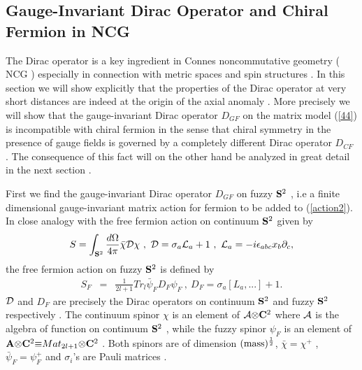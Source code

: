 \documentclass[a4paper,10pt]{article}
\begin{document}
\subsection{Gauge-Invariant Dirac Operator and Chiral Fermion in
NCG}

The Dirac operator is a key ingredient in Connes noncommutative
geometry ( NCG ) especially in connection with metric spaces and
spin structures \cite{cmlv} . In this section we will show
explicitly that the properties of the Dirac operator at very
short distances are indeed at the origin of the axial anomaly .
More precisely we will show that the gauge-invariant Dirac
operator $D_{GF}$ on the matrix model (\ref{44}) is incompatible
with chiral fermion in the sense that chiral symmetry in the
presence of gauge fields is governed by a completely different
Dirac operator $D_{CF}$ . The consequence of this fact will on
the other hand be analyzed in great detail in the next section .



First we find the gauge-invariant Dirac operator $D_{GF}$ on fuzzy
${\bf S}^2$ , i.e a finite dimensional gauge-invariant matrix
action for fermion to be added to (\ref{action2}). In close
analogy with the free fermion action on continuum ${\bf S}^2$
given by \cite{presnajder,denjoe}
\begin{eqnarray}
S=\int_{{\bf S}^2} \frac{d{\Omega}}{4{\pi}} \bar{\chi}{\cal
D}{\chi}~,~{\cal D}={\sigma}_a{\cal L}_a+1~,~{\cal
L}_a=-i{\epsilon}_{abc}x_b{\partial}_c,\label{classiii}
\end{eqnarray}
the free fermion action on fuzzy ${\bf S}^2$ is defined by
\begin{eqnarray}
S_F&=&\frac{1}{2l+1}Tr_{l}\bar{{\psi}}_F{D}_F{\psi}_F~,~ {D}_{
F}={\sigma}_a[L_a,...]+1.\label{fuzziii}
\end{eqnarray}
${\cal D}$ and $D_F$ are precisely the Dirac operators on
continuum ${\bf S}^2$ and fuzzy ${\bf
 S}^2$ respectively
\cite{trg,ydri,bal,grosse} . The continuum spinor ${\chi}$ is an
element of ${\cal A}{\otimes}{\bf C}^2$ where ${\cal A}$ is the
algebra of function on continuum ${\bf S}^2$ , while the fuzzy
spinor ${\psi}_F$ is an element of ${\bf A}{\otimes}{\bf
C}^2{\equiv}Mat_{2l+1}{\otimes}{\bf C}^2$ . Both spinors are of
dimension $({\rm mass})^{\frac{1}{2}}$, $\bar{\chi}={\chi}^{+}$ ,
$\bar{\psi}_F={\psi}_F^{+}$ and ${\sigma}_i$'s are Pauli matrices
.
\end{document}
